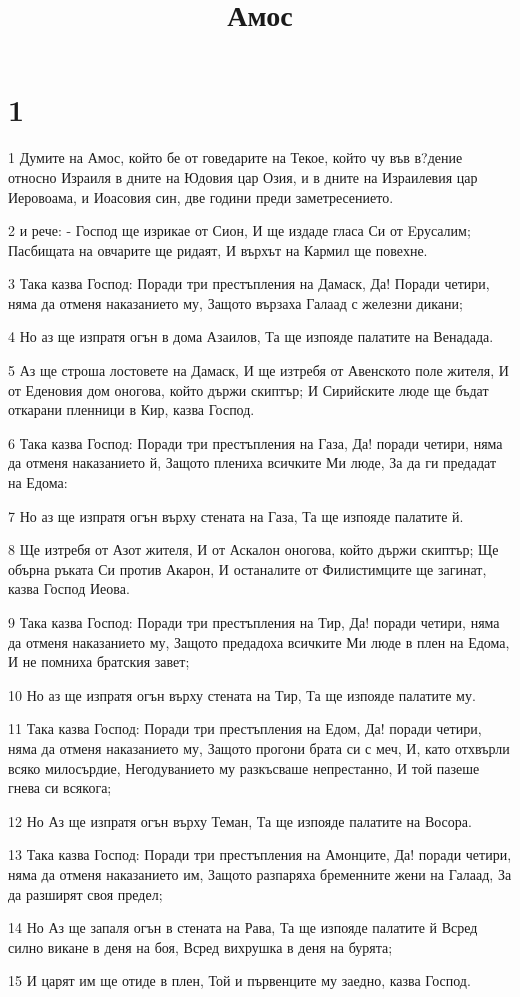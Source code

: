 

\title{Амос}


\chapter{1}

\par 1 Думите на Амос, който бе от говедарите на Текое, който чу във в?дение относно Израиля в дните на Юдовия цар Озия, и в дните на Израилевия цар Иеровоама, и Иоасовия син, две години преди заметресението.
\par 2 и рече: -  Господ ще изрикае от Сион,  И ще издаде гласа Си от Eрусалим; Пасбищата на овчарите ще ридаят, И върхът на Кармил ще повехне.
\par 3 Така казва Господ: Поради три престъпления на Дамаск, Да! Поради четири, няма да отменя наказанието му, Защото вързаха Галаад с железни дикани;
\par 4 Но аз ще изпратя огън в дома Азаилов, Та ще изпояде палатите на Венадада.
\par 5 Аз ще строша лостовете на Дамаск, И ще изтребя от Авенското поле жителя, И от Еденовия дом оногова, който държи скиптър; И Сирийските люде ще бъдат откарани пленници в Кир, казва Господ.
\par 6 Така казва Господ: Поради три престъпления на Газа, Да! поради четири, няма да отменя наказанието й, Защото плениха всичките Ми люде, За да ги предадат на Едома:
\par 7 Но аз ще изпратя огън върху стената на Газа, Та ще изпояде палатите й.
\par 8 Ще изтребя от Азот жителя, И от Аскалон оногова, който държи скиптър; Ще обърна ръката Си против Акарон, И останалите от Филистимците ще загинат, казва Господ Иеова.
\par 9 Така казва Господ: Поради три престъпления на Тир, Да! поради четири, няма да отменя наказанието му, Защото предадоха всичките Ми люде в плен на Едома, И не помниха братския завет;
\par 10 Но аз ще изпратя огън върху стената на Тир, Та ще изпояде палатите му.
\par 11 Така казва Господ: Поради три престъпления на Едом, Да! поради четири, няма да отменя наказанието му, Защото прогони брата си с меч, И, като отхвърли всяко милосърдие, Негодуванието му разкъсваше непрестанно, И той пазеше гнева си всякога;
\par 12 Но Аз ще изпратя огън върху Теман, Та ще изпояде палатите на Восора.
\par 13 Така казва Господ: Поради три престъпления на Амонците, Да! поради четири, няма да отменя наказанието им, Защото разпаряха бременните жени на Галаад, За да разширят своя предел;
\par 14 Но Аз ще запаля огън в стената на Рава, Та ще изпояде палатите й Всред силно викане в деня на боя, Всред вихрушка в деня на бурята;
\par 15 И царят им ще отиде в плен, Той и първенците му заедно, казва Господ.


